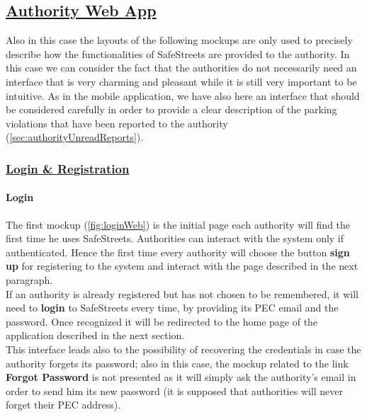 		\subsection[Authority Web App]{\hyperlink{toc}{Authority Web App}}
			\label{sec:authorityWebApp}
			
			Also in this case the layouts of the following mockups are only used to precisely describe how the functionalities of SafeStreets are provided to the authority. In this case we can consider the fact that the authorities do not necessarily need an interface that is very charming and pleasant while it is still very important to be intuitive. As in the mobile application, we have also here an interface that should be considered carefully in order to provide a clear description of the parking violations that have been reported to the authority (\autoref{sec:authorityUnreadReports}).
			
			\subsubsection[Login \& Registration]{\hyperlink{toc}{Login \& Registration}}
				\label{sec:authorityLoginRegistration}
				
				\paragraph{Login}
				The first mockup (\autoref{fig:loginWeb}) is the initial page each authority will find the first time he uses SafeStreets. Authorities can interact with the system only if authenticated. Hence the first time every authority will choose the button \textbf{sign up} for registering to the system and interact with the page described in the next paragraph.\\
				
				If an authority is already registered but has not chosen to be remembered, it will need to \textbf{login} to SafeStreets every time, by providing its PEC email and the password. Once recognized it will be redirected to the home page of the application described in the next section.\\
				
				This interface leads also to the possibility of recovering the credentials in case the authority forgets its password; also in this case, the mockup related to the link \textbf{Forgot Password} is not presented as it will simply ask the authority's email in order to send him its new password (it is supposed that authorities will never forget their PEC address).
				
